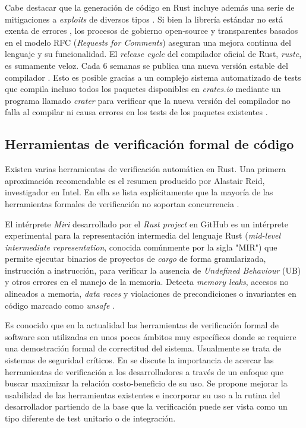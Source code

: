 \documentclass[12pt]{article}
\begin{document}
Cabe destacar que la generación de código en Rust incluye además una serie de mitigaciones a \textit{exploits} de diversos tipos \cite{rustc-mitigations}.
Si bien la librería estándar no está exenta de errores \cite{davidoff2018},
los procesos de gobierno open-source y transparentes basados en el modelo RFC (\textit{Requests for Comments}) \cite{rust-rfcs}
aseguran una mejora continua del lenguaje y su funcionalidad.
El \textit{release cycle} del compilador oficial de Rust, \textit{rustc}, es sumamente veloz.
Cada 6 semanas se publica una nueva versión estable del compilador \cite[Appendix G]{rust-book}.
Esto es posible gracias a un complejo sistema automatizado de tests que compila incluso todos los paquetes disponibles en \textit{crates.io}
mediante un programa llamado \textit{crater} para verificar que
la nueva versión del compilador no falla al compilar ni causa errores en los tests de los paquetes existentes \cite{albini2019}.

\subsection{Herramientas de verificación formal de código}

Existen varias herramientas de verificación automática en Rust.
Una primera aproximación recomendable es el resumen producido por Alastair Reid, investigador en Intel.
En ella se lista explícitamente que la mayoría de las herramientas formales de verificación no soportan concurrencia \cite{reid2021}.

El intérprete \textit{Miri} desarrollado por el \textit{Rust project} en GitHub es un intérprete experimental para la representación intermedia del lenguaje Rust
(\textit{mid-level intermediate representation}, conocida comúnmente por la sigla "MIR")
que permite ejecutar binarios de proyectos de \textit{cargo} de forma granularizada, instrucción a instrucción, para verificar la ausencia de \textit{Undefined Behaviour} (UB) y otros
errores en el manejo de la memoria.
Detecta \textit{memory leaks}, accesos no alineados a memoria, \textit{data races} y violaciones de precondiciones o invariantes en código marcado como \textit{unsafe} \cite{miri-website}.

Es conocido que en la actualidad las herramientas de verificación formal de software son utilizadas en unos pocos ámbitos muy específicos
donde se requiere una demostración formal de correctitud del sistema. Usualmente se trata de sistemas de seguridad críticos.
En \cite{reid:hatra:2020} se discute la importancia de acercar las herramientas de verificación a los desarrolladores
a través de un enfoque que buscar maximizar la relación costo-beneficio de su uso.
Se propone mejorar la usabilidad de las herramientas existentes e incorporar su uso a la rutina del desarrollador partiendo
de la base que la verificación puede ser vista como un tipo diferente de test unitario o de integración.
\end{document}
